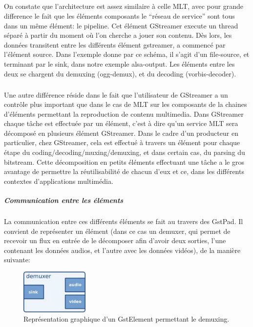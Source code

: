 \subparagraph{}

On constate que l'architecture est assez similaire à celle MLT, avec pour
grande difference le fait que les éléments composants le ``réseau de
service'' sont tous dans un même élément: le pipeline. Cet élément
GStreamer execute un thread séparé à partir du moment où l'on
cherche a jouer son contenu. Dès lors, les données transitent entre les
différents élément gstreamer, a commencé par l'élément source. Dans
l'exemple donne par ce schéma, il s'agit d'un file-source, et terminant
par le sink, dans notre exemple alsa-output. Les éléments entre les
deux se chargent du demuxing (ogg-demux), et du decoding (vorbis-decoder).

\subparagraph{}

Une autre différence réside dans le fait que l'utilisateur de
GStreamer a un contrôle plus important que dans le cas de MLT sur les
composants de la chaines d'éléments permettant la reproduction de
contenu multimedia.  Dans GStreamer chaque tâche est effectuée par un
élément, c'est à dire qu'un service MLT sera décomposé en plusieurs
élément GStreamer. Dans le cadre d'un producteur en particulier, chez
GStreamer, cela est effectué à travers un élément pour chaque étape
du coding/decoding/muxing/demuxing, et dans certain cas, du parsing
du bitstream. Cette décomposition en petits éléments effectuant une
tâche a le gros avantage de permettre la réutilisabilité de chacun
d'eux et ce, dans les différents  contextes d'applications multimédia.

\subparagraph{Communication entre les éléments}

\subparagraph{}

La communication entre ces différents éléments se fait au travers des
GstPad. Il convient de représenter un élément (dans ce cas un demuxer,
qui permet de recevoir un flux en entrée de le décomposer afin d'avoir
deux sorties, l'une contenant les données audios, et l'autre avec les
données vidéos), de la manière suivante:

\begin{figure} [H]

  \begin{center}

    \includegraphics[width=0.30\textwidth]{images/gstdemuxer}

  \end{center}

  \caption{Représentation graphique d'un GstElement permettant le
  demuxing.}

  \label{Yes}

\end{figure}

